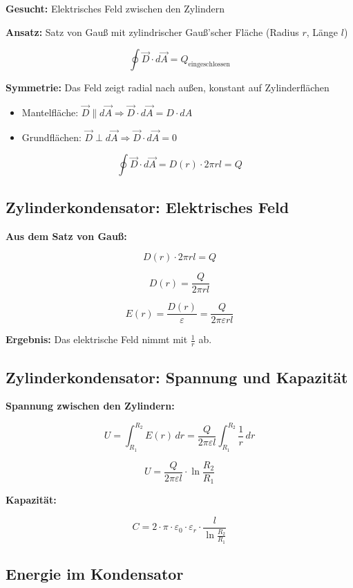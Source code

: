 \documentclass[
  11pt,
]{article}
\providecommand{\tightlist}{%
  \setlength{\itemsep}{0pt}\setlength{\parskip}{0pt}}
\begin{document}
\textbf{Gesucht:} Elektrisches Feld zwischen den Zylindern

\textbf{Ansatz:} Satz von Gauß mit zylindrischer Gauß'scher Fläche
(Radius \(r\), Länge \(l\))

\[\oint \vec{D} \cdot d\vec{A} = Q_{\text{eingeschlossen}}\]

\textbf{Symmetrie:} Das Feld zeigt radial nach außen, konstant auf
Zylinderflächen

\begin{itemize}
\tightlist
\item
  Mantelfläche:
  \(\vec{D} \parallel d\vec{A} \Rightarrow \vec{D} \cdot d\vec{A} = D \cdot dA\)
\item
  Grundflächen:
  \(\vec{D} \perp d\vec{A} \Rightarrow \vec{D} \cdot d\vec{A} = 0\)
\end{itemize}

\[\oint \vec{D} \cdot d\vec{A} = D(r) \cdot 2\pi r l = Q\]

\subsection{Zylinderkondensator: Elektrisches
Feld}\label{zylinderkondensator-elektrisches-feld}

\textbf{Aus dem Satz von Gauß:}

\[D(r) \cdot 2\pi r l = Q\]

\[D(r) = \frac{Q}{2\pi r l}\]

\[E(r) = \frac{D(r)}{\varepsilon} = \frac{Q}{2\pi \varepsilon r l}\]

\textbf{Ergebnis:} Das elektrische Feld nimmt mit \(\frac{1}{r}\) ab.

\subsection{Zylinderkondensator: Spannung und
Kapazität}\label{zylinderkondensator-spannung-und-kapazituxe4t}

\textbf{Spannung zwischen den Zylindern:}

\[U = \int_{R_1}^{R_2} E(r)\,dr = \frac{Q}{2\pi \varepsilon l} \int_{R_1}^{R_2} \frac{1}{r}\,dr\]

\[U = \frac{Q}{2\pi \varepsilon l} \cdot \ln\frac{R_2}{R_1}\]

\textbf{Kapazität:}

\[C = 2 \cdot \pi \cdot \varepsilon_0 \cdot \varepsilon_r \cdot \frac{l}{\ln\frac{R_2}{R_1}}\]

\subsection{Energie im Kondensator}\label{energie-im-kondensator}
\end{document}

